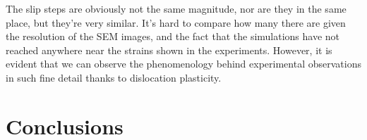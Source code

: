 The slip steps are obviously not the same magnitude, nor are they in the same place, but they're very similar. It's hard to compare how many there are given the resolution of the SEM images, and the fact that the simulations have not reached anywhere near the strains shown in the experiments. However, it is evident that we can observe the phenomenology behind experimental observations in such fine detail thanks to dislocation plasticity.

\section{Conclusions}

